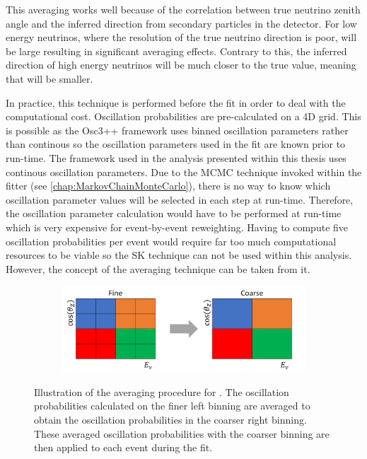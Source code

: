 This averaging works well because of the correlation between true neutrino zenith angle and the inferred direction from secondary particles in the detector. For low energy neutrinos, where the resolution of the true neutrino direction is poor,  will be large resulting in significant averaging effects. Contrary to this, the inferred direction of high energy neutrinos will be much closer to the true value, meaning that  will be smaller.

In practice, this technique is performed before the fit in order to deal with the computational cost. Oscillation probabilities are pre-calculated on a 4D grid. This is possible as the Osc3++ framework uses binned oscillation parameters rather than continous so the oscillation parameters used in the fit are known prior to run-time. The framework used in the analysis presented within this thesis uses continous oscillation parameters. Due to the MCMC technique invoked within the fitter (see \autoref{chap:MarkovChainMonteCarlo}), there is no way to know which oscillation parameter values will be selected in each step at run-time. Therefore, the oscillation parameter calculation would have to be performed at run-time which is very expensive for event-by-event reweighting. Having to compute five oscillation probabilities per event would require far too much computational resources to be viable so the SK technique can not be used within this analysis. However, the concept of the averaging technique can be taken from it.

\begin{figure}[h]
  \begin{subfigure}[t]{\textwidth}
    \includegraphics[width=\textwidth, trim={0mm 0mm 0mm 0mm}, clip,page=1]{Figures/Oscillation/SubSamplingExample.pdf}
  \end{subfigure}
  \caption{Illustration of the averaging procedure for . The oscillation probabilities calculated on the finer left binning are averaged to obtain the oscillation probabilities in the coarser right binning. These averaged oscillation probabilities with the coarser binning are then applied to each event during the fit.}
  \label{fig:Oscillation_SK_SubSamplingExample}
\end{figure}

